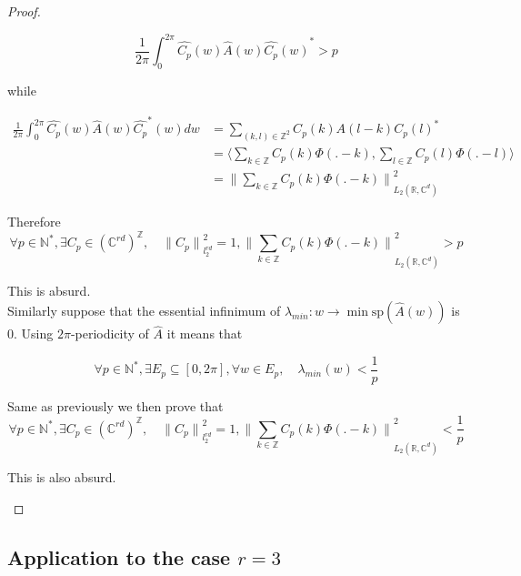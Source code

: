 \documentclass[a4paper, 11pt]{article}
\begin{document}
\begin{proof}
\begin{enumerate}
      \begin{equation*}
        \frac{1}{2\pi} \int_{0}^{2\pi} \hat{C_p}(w) \hat{A}(w) {\hat{C_p}(w)}^* > p
      \end{equation*}

      while 
  
      \begin{align*}
        \frac{1}{2\pi} \int_{0}^{2\pi} \hat{C_p}(w) \hat{A}(w) \hat{C_p}^*(w) dw &= \sum_{(k,l) \in \mathbb{Z}^2} C_p(k) 
        A(l-k){C_p(l)}^* \\
        &= \langle \sum_{k \in \mathbb{Z}} C_p(k) \Phi(.-k), \sum_{l \in \mathbb{Z}} C_p(l) \Phi(.-l) \rangle \\
        &= {\| \sum_{k \in \mathbb{Z}} C_p(k) \Phi(.-k)\|}_{L_2(\mathbb{R}, \mathbb{C}^{d})}^2
      \end{align*}

      Therefore
      \begin{equation}
        \forall p \in \mathbb{N}^*, \exists C_p \in {(\mathbb{C}^{rd})}^{\mathbb{Z}}, \quad {\|C_p\|}^2_{l_2^{rd}} = 1, 
        {\| \sum_{k \in \mathbb{Z}} C_p(k) \Phi(.-k)\|}_{L_2(\mathbb{R}, \mathbb{C}^{d})}^2 > p
      \end{equation}


      This is absurd. \\


    Similarly suppose that the essential infinimum of $\lambda_{min}: w \to \min \text{sp} (\hat{A}(w))$ is 0.  Using 
    $2\pi$-periodicity of $\hat{A}$ it means that

      \begin{equation*}
        \forall p \in \mathbb{N}^*, \exists E_p \subseteq [0, 2\pi], \forall w \in E_p, \quad \lambda_{min}(w)  < 
        \frac{1}{p}
      \end{equation*}

      Same as previously we then prove that
      \begin{equation}
        \forall p \in \mathbb{N}^*, \exists C_p \in {(\mathbb{C}^{rd})}^{\mathbb{Z}}, \quad {\|C_p\|}^2_{l_2^{rd}} = 1, 
        {\| \sum_{k \in \mathbb{Z}} C_p(k) \Phi(.-k)\|}_{L_2(\mathbb{R}, \mathbb{C}^{d})}^2 < \frac{1}{p}
      \end{equation}

    This is also absurd.
  \end{enumerate}
\end{proof}

\subsection{Application to the case $r=3$}
\end{document}

